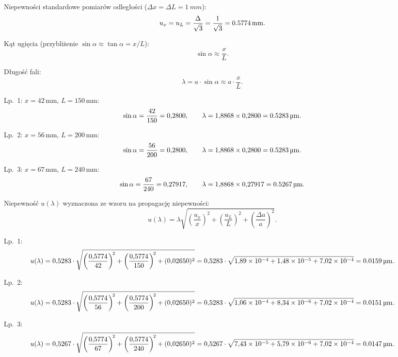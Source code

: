 \documentclass[a4paper,12pt]{article}
\begin{document}
\noindent Niepewności standardowe pomiarów odległości ($\Delta x = \Delta L = \SI{1}{mm}$):
\[
  u_x = u_L = \frac{\Delta}{\sqrt{3}} = \frac{1}{\sqrt{3}} = \SI{0{,}5774}{mm}.
\]

\noindent Kąt ugięcia (przybliżenie $\sin\alpha \approx \tan\alpha = x/L$):
\[
  \sin\alpha \approx \frac{x}{L}.
\]

\noindent Długość fali:
\[
  \lambda = a \cdot \sin\alpha \approx a \cdot \frac{x}{L}.
\]

\noindent Lp.~1: $x = 42\,\text{mm}$, $L = 150\,\text{mm}$:
\[
  \sin\alpha = \frac{42}{150} = 0{,}2800, \qquad
  \lambda = 1{,}8868 \times 0{,}2800 = \SI{0{,}5283}{\micro m}.
\]

\noindent Lp.~2: $x = 56\,\text{mm}$, $L = 200\,\text{mm}$:
\[
  \sin\alpha = \frac{56}{200} = 0{,}2800, \qquad
  \lambda = 1{,}8868 \times 0{,}2800 = \SI{0{,}5283}{\micro m}.
\]

\noindent Lp.~3: $x = 67\,\text{mm}$, $L = 240\,\text{mm}$:
\[
  \sin\alpha = \frac{67}{240} = 0{,}27917, \qquad
  \lambda = 1{,}8868 \times 0{,}27917 = \SI{0{,}5267}{\micro m}.
\]

\noindent Niepewność $u(\lambda)$ wyznaczona ze wzoru na propagację niepewności:
\[
  u(\lambda) = \lambda \sqrt{\left(\frac{u_x}{x}\right)^{\!2}
                            + \left(\frac{u_L}{L}\right)^{\!2}
                            + \left(\frac{\Delta a}{a}\right)^{\!2}}.
\]

\noindent Lp.~1:
\[
  u(\lambda) = 0{,}5283 \cdot \sqrt{\left(\frac{0{,}5774}{42}\right)^{\!2}
                                    + \left(\frac{0{,}5774}{150}\right)^{\!2}
                                    + (0{,}02650)^2}
             = 0{,}5283 \cdot \sqrt{1{,}89 \times 10^{-4}
                                    + 1{,}48 \times 10^{-5}
                                    + 7{,}02 \times 10^{-4}}
             = \SI{0{,}0159}{\micro m}.
\]

\noindent Lp.~2:
\[
  u(\lambda) = 0{,}5283 \cdot \sqrt{\left(\frac{0{,}5774}{56}\right)^{\!2}
                                    + \left(\frac{0{,}5774}{200}\right)^{\!2}
                                    + (0{,}02650)^2}
             = 0{,}5283 \cdot \sqrt{1{,}06 \times 10^{-4}
                                    + 8{,}34 \times 10^{-6}
                                    + 7{,}02 \times 10^{-4}}
             = \SI{0{,}0151}{\micro m}.
\]

\noindent Lp.~3:
\[
  u(\lambda) = 0{,}5267 \cdot \sqrt{\left(\frac{0{,}5774}{67}\right)^{\!2}
                                    + \left(\frac{0{,}5774}{240}\right)^{\!2}
                                    + (0{,}02650)^2}
             = 0{,}5267 \cdot \sqrt{7{,}43 \times 10^{-5}
                                    + 5{,}79 \times 10^{-6}
                                    + 7{,}02 \times 10^{-4}}
             = \SI{0{,}0147}{\micro m}.
\]
\end{document}
